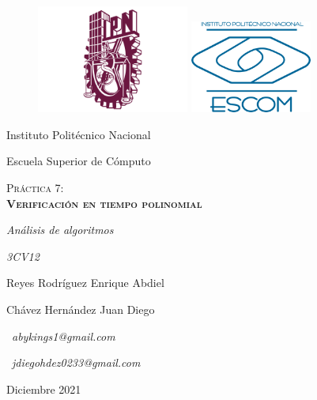 \documentclass{article}
\begin{document}
\begin{titlepage}
        \begin{figure}
            \vspace{-8 em}
            \hspace{-10 em}
            \includegraphics[width=5cm]{ipn} \hfill \includegraphics[width=4cm]{escom}
            \hspace{-8 em}
        \end{figure}
        \begin{center}
            {\large Instituto Politécnico Nacional \par}
            {\Large Escuela Superior de Cómputo \par}
            \vspace{3cm}
            {\scshape\Huge Práctica 7:\\ \bfseries Verificación en tiempo polinomial \par}
            \vspace{3cm}
            {\itshape\Large Análisis de algoritmos \par}
            {\itshape\Large 3CV12 \par}
            \vfill
            {\Large Reyes Rodríguez Enrique Abdiel \par}
            {\Large Chávez Hernández Juan Diego \par}
            \vfill
            {\ \textit{abykings1@gmail.com} \par}
            {\ \textit{jdiegohdez0233@gmail.com} \par}
            \vfill
            {\Large Diciembre 2021\par}
        \end{center}
    \end{titlepage}
\newpage
\end{document}
